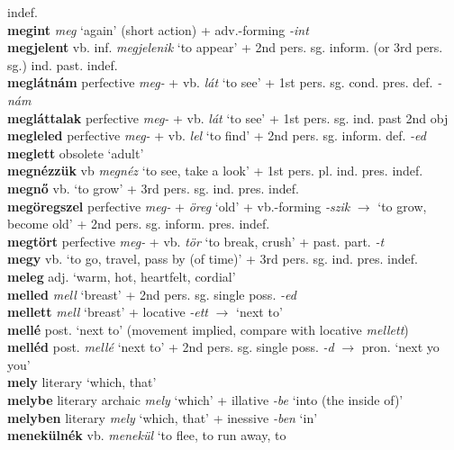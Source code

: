 \documentclass[11pt]{article}
\begin{document}
indef. \\
\textbf{megint} \emph{meg} `again' (short action) +
adv.\hyp{}forming \emph{-int} \\
\textbf{megjelent} vb. inf. \emph{megjelenik} `to appear' + 2nd
pers. sg. inform. (or 3rd pers. sg.) ind. past. indef. \\
\textbf{meglátnám} perfective \emph{meg-} + vb. \emph{lát}
`to see' + 1st pers. sg. cond. pres. def. \emph{-nám} \\
\textbf{megláttalak} perfective \emph{meg-} + vb. \emph{lát}
`to see' + 1st pers. sg. ind. past 2nd obj \\
\textbf{megleled} perfective \emph{meg-} + vb. \emph{lel} `to
find' + 2nd pers. sg. inform. def. \emph{-ed} \\
\textbf{meglett} obsolete `adult' \\
\textbf{megnézzük} vb \emph{megnéz} `to see, take a look' + 1st
pers. pl. ind. pres. indef. \\
\textbf{megnő} vb. `to grow' + 3rd pers. sg. ind. pres. indef. \\
\textbf{megöregszel} perfective \emph{meg-} +
\emph{öreg} `old' + vb.\hyp{}forming \emph{-szik}
$\rightarrow$ `to grow, become old' + 2nd
pers. sg. inform. pres. indef. \\
\textbf{megtört} perfective \emph{meg-} + vb. \emph{tör} `to
    break, crush' + past. part. \emph{-t} \\
\textbf{megy} vb. `to go, travel, pass by (of time)' + 3rd
pers. sg. ind. pres. indef. \\
\textbf{meleg} adj. `warm, hot, heartfelt, cordial' \\
\textbf{melled} \emph{mell} `breast' + 2nd pers. sg. single
poss. \emph{-ed} \\
\textbf{mellett} \emph{mell} `breast' + locative \emph{-ett}
$\rightarrow$ `next to' \\
\textbf{mellé} post. `next to' (movement implied, compare
with locative \emph{mellett}) \\
\textbf{melléd} post. \emph{mellé} `next to' + 2nd pers. sg. single
  poss. \emph{-d} $\rightarrow$ pron. `next yo you' \\
\textbf{mely} literary `which, that' \\
\textbf{melybe} literary archaic \emph{mely} `which' + illative \emph{-be}
`into (the inside of)' \\
\textbf{melyben} literary \emph{mely} `which, that' + inessive \emph{-ben}
`in' \\
\textbf{menekülnék} vb. \emph{menekül} `to flee, to run away, to
\end{document}
